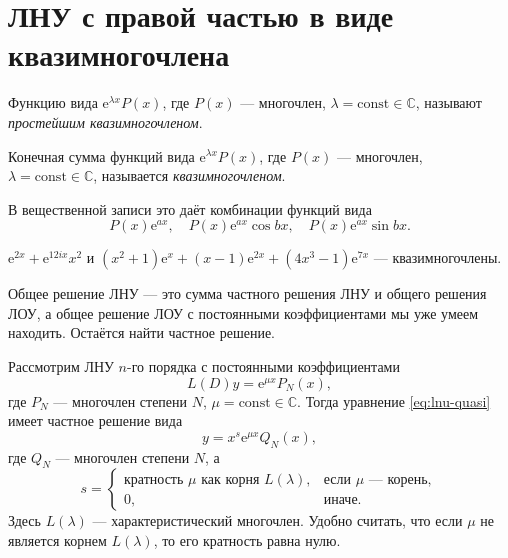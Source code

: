 \documentclass[12pt,a4paper]{article}
\numberwithin{equation}{section}
\newcommand{\e}{\mathrm{e}}
\begin{document}
\section[Квазимногочлен]{ЛНУ с правой частью в виде квазимногочлена}
\label{sec:quasi}

Функцию вида \(\e^{\lambda x}P(x)\), где \(P(x)\) --- многочлен, \(\lambda=\mathrm{const}\in\mathbb C\), называют \textit{простейшим квазимногочленом}.

\begin{definitionHSE}[Квазимногочлен]
Конечная сумма функций вида \(\e^{\lambda x}P(x)\), где \(P(x)\) --- многочлен, \(\lambda=\mathrm{const}\in\mathbb C\), называется \textit{квазимногочленом}.

В вещественной записи это даёт комбинации функций вида
\[
P(x)\e^{ax},\quad
P(x)\e^{ax}\cos bx,\quad
P(x)\e^{ax}\sin bx.
\]
\end{definitionHSE}

\begin{exampleHSE}
\(\e^{2x}+\e^{12ix}x^2\) и \((x^2+1)\e^{x}+(x-1)\e^{2x}+(4x^3-1)\e^{7x}\) --- квазимногочлены.
\end{exampleHSE}

Общее решение ЛНУ --- это сумма частного решения ЛНУ и общего решения ЛОУ, а общее решение ЛОУ с постоянными коэффициентами мы уже умеем находить. Остаётся найти частное решение.

\begin{theoremHSE}
Рассмотрим ЛНУ \(n\)-го порядка с постоянными коэффициентами
\begin{equation}
L(D)y=\e^{\mu x}P_N(x),
\label{eq:lnu-quasi}
\end{equation}
где \(P_N\) --- многочлен степени \(N\), \(\mu=\mathrm{const}\in\mathbb C\). Тогда уравнение \eqref{eq:lnu-quasi} имеет частное решение вида
\[
y=x^s\e^{\mu x}Q_N(x),
\]
где \(Q_N\) --- многочлен степени \(N\), а
\[
s=\begin{cases}
\text{кратность }\mu\text{ как корня }L(\lambda),&\text{если }\mu\text{ --- корень},\\
0,&\text{иначе}.
\end{cases}
\]
Здесь \(L(\lambda)\) --- характеристический многочлен. Удобно считать, что если \(\mu\) не является корнем \(L(\lambda)\), то его кратность равна нулю.
\end{theoremHSE}
\end{document}
